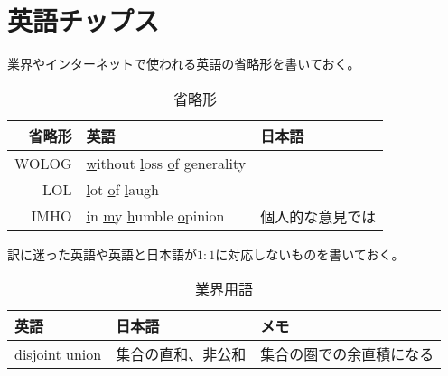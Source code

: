 \section{英語チップス}\label{s1:英語チップス} %
	業界やインターネットで使われる英語の省略形を書いておく。
	\begin{table}[htbp] %
		\begin{center}\begin{tabular}{rll} \hline
			省略形 & 英語 & 日本語 \\ \hline
			WOLOG & \underline{w}ithout \underline{l}oss \underline{o}f
				\underline{g}enerality \\
			LOL & \underline{l}ot \underline{o}f \underline{l}augh \\
			IMHO & \underline{i}n \underline{m}y \underline{h}umble
				\underline{o}pinion & 個人的な意見では \\
		\end{tabular}\end{center}
		\caption{省略形}
	\end{table} %

	訳に迷った英語や英語と日本語が$1:1$に対応しないものを書いておく。
	\begin{table}[htbp] %
		\begin{center}\begin{tabular}{lll} \hline
			英語 & 日本語 & メモ \\ \hline
			disjoint union & 集合の直和、非公和 & 集合の圏での余直積になる \\
		\end{tabular}\end{center}
		\caption{業界用語}
	\end{table} %

